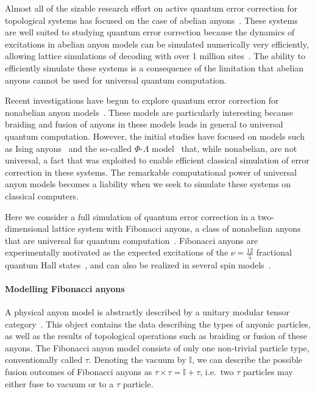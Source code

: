 \documentclass[aps, prl, letterpaper, twocolumn, superscriptaddress, notitlepage]{revtex4-1}
\begin{document}
Almost all of the sizable research effort on active quantum error correction for topological 
systems has focused on the case of abelian anyons~\cite{Terhal2014}. These systems are 
well suited to studying quantum error correction because the dynamics of excitations in 
abelian anyon models can be simulated numerically very efficiently, allowing lattice 
simulations of decoding with over 1 million sites~\cite{Duclos-Cianci2010}. The ability to 
efficiently simulate these systems is a consequence of the limitation that abelian anyons 
cannot be used for universal quantum computation. 

Recent investigations have begun to explore quantum error correction for nonabelian anyon 
models~\cite{Brell2013, Wootton2013, Hutter2014}. These models are particularly interesting 
because braiding and fusion of anyons in these models leads in general to universal quantum 
computation. However, the initial studies have focused on models such as Ising 
anyons~\cite{Brell2013} and the so-called $\Phi$-$\Lambda$ 
model~\cite{Wootton2013, Hutter2014} that, while nonabelian, are not universal, a fact 
that was exploited to enable efficient classical simulation of error correction in these systems. 
The remarkable computational power of universal anyon models becomes a liability when we 
seek to simulate these systems on classical computers. 

Here we consider a full simulation of quantum error correction in a two-dimensional lattice 
system with Fibonacci anyons, a class of nonabelian anyons that are universal for quantum 
computation~\cite{Wang2010b}. Fibonacci anyons are experimentally motivated as the 
expected excitations of the $\nu=\frac{12}{5}$ fractional quantum Hall 
states~\cite{Slingerland2001}, and can also be realized in several spin 
models~\cite{Levin2005, Kapit2013, Palumbo2014}. 


\paragraph{Modelling Fibonacci anyons}

A physical anyon model is abstractly described by a unitary modular tensor 
category~\cite{Wang2010b}. This object contains the data describing the types of anyonic 
particles, as well as the results of topological operations such as braiding or fusion of these 
anyons. The Fibonacci anyon model consists of only one non-trivial particle type, 
conventionally called $\tau$. Denoting the vacuum by $\mathbb{I}$, we can describe the 
possible fusion outcomes of Fibonacci anyons as $\tau\times\tau=\mathbb{I}+\tau$, i.e.~two 
$\tau$ particles may either fuse to vacuum or to a $\tau$ particle.
\end{document}
